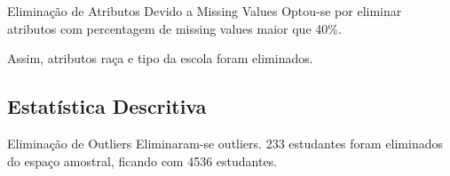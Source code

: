 \begin{frame}{Eliminação de Atributos Devido a Missing Values}
    Optou-se por eliminar atributos com percentagem de missing values maior que 40\%.
        
    \vspace{0.5cm}
    
    Assim, atributos raça e tipo da escola foram eliminados. 
\end{frame}


\subsection{Estatística Descritiva}
\begin{frame}{Eliminação de Outliers}
    Eliminaram-se outliers. 233 estudantes foram eliminados do espaço amostral,
    ficando com 4536 estudantes.  
\end{frame}
